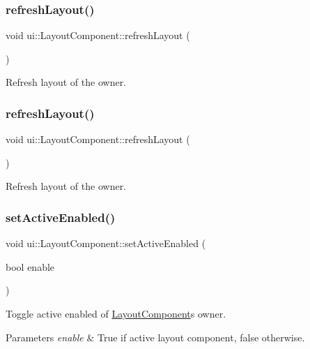 \subsubsection{\texorpdfstring{refresh\+Layout()}{refreshLayout()}\hspace{0.1cm}{\footnotesize\ttfamily [1/2]}}
{\footnotesize\ttfamily void ui\+::\+Layout\+Component\+::refresh\+Layout (\begin{DoxyParamCaption}{ }\end{DoxyParamCaption})}

Refresh layout of the owner. \mbox{\label{classui_1_1LayoutComponent_a71d6fd230951a624210a0501033a9c56}} 
\subsubsection{\texorpdfstring{refresh\+Layout()}{refreshLayout()}\hspace{0.1cm}{\footnotesize\ttfamily [2/2]}}
{\footnotesize\ttfamily void ui\+::\+Layout\+Component\+::refresh\+Layout (\begin{DoxyParamCaption}{ }\end{DoxyParamCaption})}

Refresh layout of the owner. \mbox{\label{classui_1_1LayoutComponent_a781f5c70717d610553e5be7ece0b392f}} 
\subsubsection{\texorpdfstring{set\+Active\+Enabled()}{setActiveEnabled()}\hspace{0.1cm}{\footnotesize\ttfamily [1/2]}}
{\footnotesize\ttfamily void ui\+::\+Layout\+Component\+::set\+Active\+Enabled (\begin{DoxyParamCaption}\item[{bool}]{enable }\end{DoxyParamCaption})}

Toggle active enabled of \hyperlink{classui_1_1LayoutComponent}{Layout\+Component}\textquotesingle{}s owner. 
\begin{DoxyParams}{Parameters}
{\em enable} & True if active layout component, false otherwise. \\
\hline
\end{DoxyParams}
\mbox{\label{classui_1_1LayoutComponent_a781f5c70717d610553e5be7ece0b392f}} 
